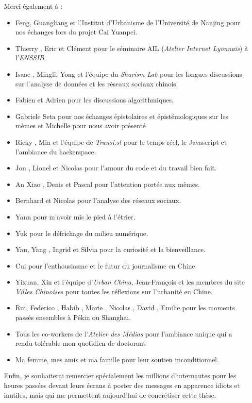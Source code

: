 Merci également à : 
\begin{itemize}
    \item {} Feng, {} Guangliang et l'Institut d'Urbanisme de l'Université de Nanjing pour  nos échanges lors du projet Cai Yuanpei.
    \item Thierry {}, Eric {} et Clément {} pour le séminaire AIL (\textit{Atelier Internet Lyonnais}) à l'\textit{ENSSIB}.
    \item Isaac {}, {} Mingli, {} Yong et l'équipe du \textit{Sharism Lab} pour les longues discussions sur l'analyse de données et les réseaux sociaux chinois.
    \item Fabien {} et Adrien {} pour les discussions algorithmiques.
    \item Gabriele {} Seta pour nos échanges épistolaires et épistémologiques sur les mèmes et Michelle {} pour nous avoir présenté
    \item Ricky {}, Min {} et l'équipe de \textit{Transi.st} pour le temps-réel, le Javascript et l'ambiance du hackerspace.
    \item Jon {}, Lionel {} et Nicolas {} pour l'amour du code et du travail bien fait.
    \item An Xiao {}, Denis {} et Pascal {} pour l'attention portée aux mèmes.
    \item Bernhard {} et Nicolas {} pour l'analyse des réseaux sociaux.
    \item Yann {} pour m'avoir mis le pied à l'étrier.
    \item Yuk {} pour le défrichage du milieu numérique.
    \item {} Yan, Yang {}, Ingrid {} et Silvia {} pour la curiosité et la bienveillance.
    \item Cui {} pour l'enthousiasme et le futur du journalisme en Chine
    \item {} Yixuan, {} Xin et l'équipe d'\textit{Urban China}, Jean-François {} et les membres du site \textit{Villes Chinoises} pour toutes les réflexions sur l'urbanité en Chine.
    \item {} Rui, Federico {}, Habib {}, Marie {}, Nicolas {}, David {}, Emilie {} pour les moments passés ensembles à Pékin ou Shanghai.
    \item Tous les co-workers de l'\textit{Atelier des Médias} pour l'ambiance unique qui a rendu tolérable mon quotidien de doctorant
    \item Ma femme, mes amis et ma famille pour leur soutien inconditionnel.
\end{itemize}

Enfin, je souhaiterai remercier spécialement les millions d'internautes pour les heures passées devant leurs écrans à poster des messages en apparence idiots et inutiles, mais qui me permettent aujourd'hui de concrétiser cette thèse.